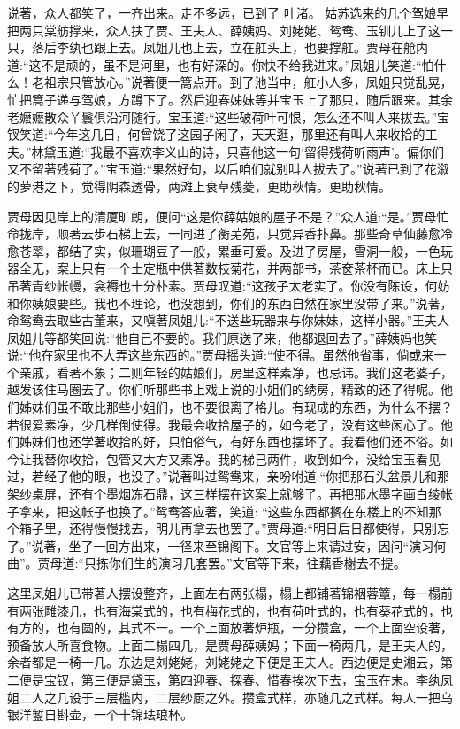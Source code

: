\begin{parag}
    说著，众人都笑了，一齐出来。走不多远，已到了 叶渚。 姑苏选来的几个驾娘早把两只棠舫撑来，众人扶了贾、王夫人、薛姨妈、刘姥姥、鸳鸯、玉钏儿上了这一只，落后李纨也跟上去。凤姐儿也上去，立在舡头上，也要撑舡。贾母在舱内道:“这不是顽的，虽不是河里，也有好深的。你快不给我进来。”凤姐儿笑道:“怕什么！老祖宗只管放心。”说著便一篙点开。到了池当中，舡小人多，凤姐只觉乱晃，忙把篙子递与驾娘，方蹲下了。然后迎春姊妹等并宝玉上了那只，随后跟来。其余老嬷嬷散众丫鬟俱沿河随行。宝玉道:“这些破荷叶可恨，怎么还不叫人来拔去。”宝钗笑道:“今年这几日，何曾饶了这园子闲了，天天逛，那里还有叫人来收拾的工夫。”林黛玉道:“我最不喜欢李义山的诗，只喜他这一句‘留得残荷听雨声’。偏你们又不留著残荷了。”宝玉道:“果然好句，以后咱们就别叫人拔去了。”说著已到了花溆的萝港之下，觉得阴森透骨，两滩上衰草残菱，更助秋情。更助秋情。
\end{parag}


\begin{parag}
    贾母因见岸上的清厦旷朗，便问“这是你薛姑娘的屋子不是？”众人道:“是。”贾母忙命拢岸，顺著云步石梯上去，一同进了蘅芜苑，只觉异香扑鼻。那些奇草仙藤愈冷愈苍翠，都结了实，似珊瑚豆子一般，累垂可爱。及进了房屋，雪洞一般，一色玩器全无，案上只有一个土定瓶中供著数枝菊花，并两部书，茶奁茶杯而已。床上只吊著青纱帐幔，衾褥也十分朴素。贾母叹道:“这孩子太老实了。你没有陈设，何妨和你姨娘要些。我也不理论，也没想到，你们的东西自然在家里没带了来。”说著，命鸳鸯去取些古董来，又嗔著凤姐儿:“不送些玩器来与你妹妹，这样小器。”王夫人凤姐儿等都笑回说:“他自己不要的。我们原送了来，他都退回去了。”薛姨妈也笑说:“他在家里也不大弄这些东西的。”贾母摇头道:“使不得。虽然他省事，倘或来一个亲戚，看著不象；二则年轻的姑娘们，房里这样素净，也忌讳。我们这老婆子，越发该住马圈去了。你们听那些书上戏上说的小姐们的绣房，精致的还了得呢。他们姊妹们虽不敢比那些小姐们，也不要很离了格儿。有现成的东西，为什么不摆？若很爱素净，少几样倒使得。我最会收拾屋子的，如今老了，没有这些闲心了。他们姊妹们也还学著收拾的好，只怕俗气，有好东西也摆坏了。我看他们还不俗。如今让我替你收拾，包管又大方又素净。我的梯己两件，收到如今，没给宝玉看见过，若经了他的眼，也没了。”说著叫过鸳鸯来，亲吩咐道:“你把那石头盆景儿和那架纱桌屏，还有个墨烟冻石鼎，这三样摆在这案上就够了。再把那水墨字画白绫帐子拿来，把这帐子也换了。”鸳鸯答应著，笑道: “这些东西都搁在东楼上的不知那个箱子里，还得慢慢找去，明儿再拿去也罢了。”贾母道:“明日后日都使得，只别忘了。”说著，坐了一回方出来，一径来至锦阁下。文官等上来请过安，因问“演习何曲”。贾母道:“只拣你们生的演习几套罢。”文官等下来，往藕香榭去不提。
\end{parag}


\begin{parag}
    这里凤姐儿已带著人摆设整齐，上面左右两张榻，榻上都铺著锦裀蓉簟，每一榻前有两张雕漆几，也有海棠式的，也有梅花式的，也有荷叶式的，也有葵花式的，也有方的，也有圆的，其式不一。一个上面放著炉瓶，一分攒盒，一个上面空设著，预备放人所喜食物。上面二榻四几，是贾母薛姨妈；下面一椅两几，是王夫人的，余者都是一椅一几。东边是刘姥姥，刘姥姥之下便是王夫人。西边便是史湘云，第二便是宝钗，第三便是黛玉，第四迎春、探春、惜春挨次下去，宝玉在末。李纨凤姐二人之几设于三层槛内，二层纱厨之外。攒盒式样，亦随几之式样。每人一把乌银洋錾自斟壶，一个十锦珐琅杯。
\end{parag}


